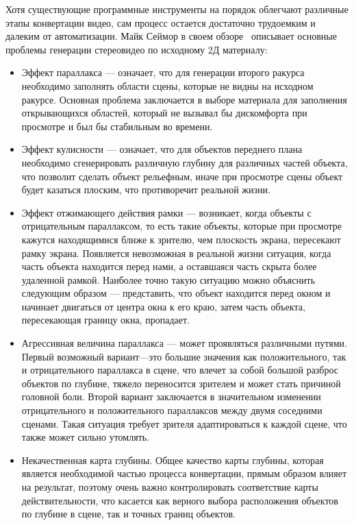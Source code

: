 \documentclass[14pt, a4paper]{extarticle}
\begin{document}
Хотя существующие программные инструменты на порядок облегчают различные 
этапы конвертации видео, сам процесс остается достаточно трудоемким и 
далеким от автоматизации. Майк Сеймор в своем обзоре~\cite{seymour2012art} 
описывает основные проблемы генерации стереовидео по исходному 2Д материалу:
\begin{itemize}
	\item Эффект параллакса --- означает, что для генерации второго ракурса 
	необходимо заполнять области сцены, которые не видны на исходном ракурсе. 
	Основная проблема заключается в выборе материала для заполнения открывающихся 
	областей, который не вызывал бы дискомфорта при просмотре и был бы стабильным во времени.
	\item Эффект кулисности --- означает, что для объектов переднего плана необходимо 
	сгенерировать различную глубину для различных частей объекта, что позволит сделать 
	объект рельефным, иначе при просмотре сцены объект будет казаться плоским, 
	что противоречит реальной жизни.
	\item Эффект отжимающего действия рамки --- возникает, когда объекты с отрицательным 
	параллаксом, то есть такие объекты, которые при просмотре кажутся находящимися ближе к зрителю, 
	чем плоскость экрана, пересекают рамку экрана. Появляется невозможная в реальной 
	жизни ситуация, когда часть объекта находится перед нами, а оставшаяся часть скрыта 
	более удаленной рамкой. Наиболее точно такую ситуацию можно объяснить следующим 
	образом --- представить, что объект находится перед окном и начинает двигаться 
	от центра окна к его краю, затем часть объекта, пересекающая границу окна, пропадает.
	\item Агрессивная величина параллакса --- может проявляться различными путями. 
	Первый возможный вариант---это большие значения как положительного, так и 
	отрицательного параллакса в сцене, что влечет за собой большой разброс объектов 
	по глубине, тяжело переносится зрителем и может стать причиной головной боли. 
	Второй вариант заключается в значительном изменении отрицательного и положительного 
	параллаксов между двумя соседними сценами. Такая ситуация требует зрителя 
	адаптироваться к каждой сцене, что также может сильно утомлять.
	\item Некачественная карта глубины. Общее качество карты глубины, которая является 
	необходимой частью процесса конвертации, прямым образом влияет на результат, 
	поэтому очень важно контролировать соответствие карты действительности, 
	что касается как верного выбора расположения объектов по глубине в сцене, 
	так и точных границ объектов.
\end{itemize}
\end{document}
